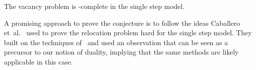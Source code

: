 \documentclass[a4paper,UKenglish,cleveref,thm-restate]{lipics-v2021}
\begin{document}
\begin{conjecture}\label{conj:vacancy}
The vacancy problem is \PSPACE-complete in the single step model.
\end{conjecture}

A promising approach to prove the conjecture is to follow the ideas
Caballero et~al.~\cite{caballero-cccg20-hardness} used to prove the relocation
problem hard for the single step model. They built on the techniques
of~\cite{hierarchical2020} and used an observation that can be seen as a
precursor to our notion of duality, implying that the same methods are likely
applicable in this case.
\newpage
 
    
\end{document}
